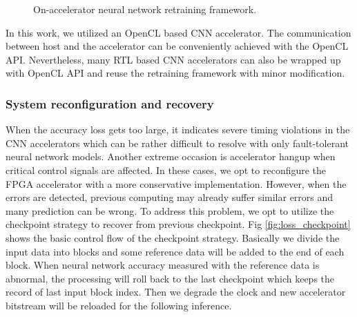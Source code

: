 \begin{figure}
    \caption{On-accelerator neural network retraining framework.}
\label{fig:retrain}
\vspace{-1em}
\end{figure}


In this work, we utilized an OpenCL based CNN accelerator. The communication between 
host and the accelerator can be conveniently achieved with the OpenCL API. 
Nevertheless, many RTL based CNN accelerators can also be wrapped up with 
OpenCL API and reuse the retraining framework with minor modification.

\subsubsection{System reconfiguration and recovery}
When the accuracy loss gets too large, it indicates severe timing 
violations in the CNN accelerators which can be rather difficult to resolve with 
only fault-tolerant neural network models. Another extreme occasion is 
accelerator hangup when critical control signals are affected. In these cases, we 
opt to reconfigure the FPGA accelerator with a more conservative implementation.
However, when the errors are detected, previous computing may already suffer 
similar errors and many prediction can be wrong. To address this problem, we opt to 
utilize the checkpoint strategy to recover from previous checkpoint. 
Fig \ref{fig:loss_checkpoint} shows the basic control flow of the checkpoint strategy.
Basically we divide the input data into blocks and some reference data 
will be added to the end of each block. When neural network accuracy measured with 
the reference data is abnormal, the processing will roll back to the last checkpoint 
which keeps the record of last input block index. Then we degrade the clock and 
new accelerator bitstream will be reloaded for the following inference.



